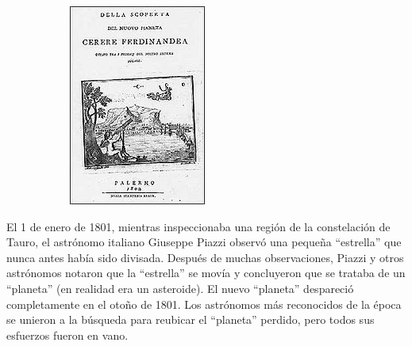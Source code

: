 {\begin{frame}
\begin{figure}
\begin{subfigure}[b]{0.23\textwidth}
		\includegraphics[width=\textwidth]{imagenes/Cerere}
	\end{subfigure}
\end{figure}


\begin{defi}{}\justifying
	El 1 de enero de 1801, mientras inspeccionaba una región de la constelación de Tauro, 
	el astrónomo italiano Giuseppe Piazzi observó una pequeña ``estrella'' que nunca antes había
	sido divisada. Después de muchas observaciones, Piazzi y otros astrónomos notaron que la
	``estrella'' se movía y concluyeron que se trataba de un ``planeta'' (en realidad era un asteroide).
	El nuevo ``planeta'' despareció completamente en el otoño de 1801. Los astrónomos más reconocidos 
	de la época se unieron a la búsqueda para reubicar el ``planeta'' perdido, pero todos sus 
	esfuerzos fueron en vano.
\end{defi}	

\end{frame}
}

